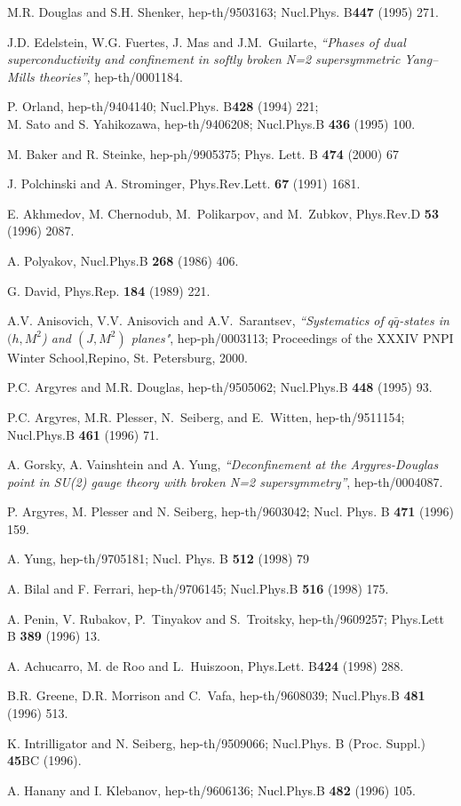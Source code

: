 \documentclass[a4paper,12pt]{article}
\begin{document}
\begin{thebibliography}{99}
 M.R. Douglas and S.H. Shenker, hep-th/9503163;
Nucl.Phys. B{\bf447} (1995) 271.

J.D. Edelstein, W.G. Fuertes, J. Mas and
J.M.~Guilarte, {\em ``Phases of dual superconductivity and
confinement in softly broken {\cal N}=2 supersymmetric Yang--Mills
theories''}, hep-th/0001184.


 P. Orland, hep-th/9404140; Nucl.Phys. B{\bf428}
(1994) 221;\\ M. Sato and S. Yahikozawa, hep-th/9406208;
Nucl.Phys.B {\bf436} (1995) 100.


M. Baker and R. Steinke, hep-ph/9905375;
Phys. Lett. B {\bf474} (2000) 67


J. Polchinski and A. Strominger, Phys.Rev.Lett.
{\bf67} (1991) 1681.

E. Akhmedov, M. Chernodub, M.~Polikarpov, and
M.~Zubkov, Phys.Rev.D {\bf53} (1996) 2087.

A. Polyakov, Nucl.Phys.B {\bf268} (1986) 406.

G. David, Phys.Rep. {\bf184} (1989) 221.

 A.V. Anisovich, V.V. Anisovich
 and A.V.~Sarantsev, {\em ``Systematics of $q\bar
q$-states in $(h,M^2$) and $(J,M^2)$ planes"},
hep-ph/0003113; Proceedings of
the XXXIV PNPI Winter School,Repino, St. Petersburg, 2000.

P.C. Argyres and M.R. Douglas, hep-th/9505062;
Nucl.Phys.B {\bf448} (1995) 93.

P.C. Argyres, M.R. Plesser, N.~Seiberg, and
E.~Witten, hep-th/9511154; Nucl.Phys.B {\bf461} (1996) 71.

 A. Gorsky, A. Vainshtein and A. Yung, {\em
``Deconfinement at the Argyres-Douglas point in SU(2) gauge theory
with broken {\cal N}=2 supersymmetry''}, hep-th/0004087.

 P. Argyres, M. Plesser and N. Seiberg, hep-th/9603042;
Nucl. Phys. B {\bf471} (1996) 159.

 A. Yung, hep-th/9705181; Nucl. Phys. B {\bf512} (1998) 79

 A. Bilal and F. Ferrari, hep-th/9706145;
Nucl.Phys.B {\bf516} (1998) 175.

A. Penin, V. Rubakov, P.~Tinyakov and S.~Troitsky,
hep-th/9609257; Phys.Lett B {\bf389} (1996) 13.

 A. Achucarro, M. de Roo and L.~Huiszoon,
Phys.Lett. B{\bf424} (1998) 288.

 B.R. Greene, D.R. Morrison and C.~Vafa,
hep-th/9608039; Nucl.Phys.B {\bf481} (1996) 513.

 K. Intrilligator and N. Seiberg, hep-th/9509066;
Nucl.Phys. B (Proc. Suppl.) {\bf45}BC (1996).

A. Hanany and I. Klebanov, hep-th/9606136;
Nucl.Phys.B {\bf482} (1996) 105.




\end{thebibliography}
\end{document}
